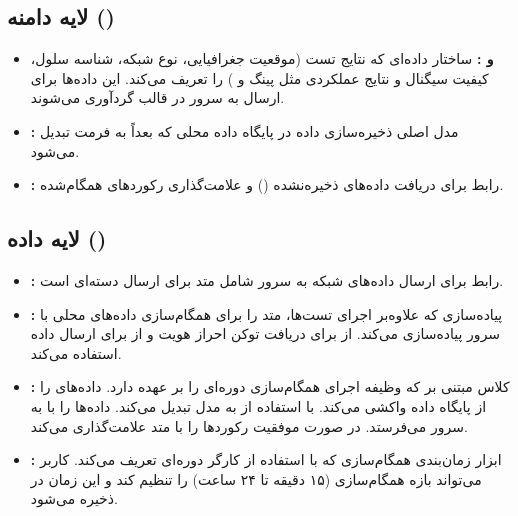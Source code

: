 \subsection{لایه دامنه ()}
\begin{itemize}
    \item \textbf{ و :}  
    ساختار داده‌ای که نتایج تست (موقعیت جغرافیایی، نوع شبکه، شناسه سلول، کیفیت سیگنال و نتایج عملکردی مثل پینگ و ) را تعریف می‌کند. این داده‌ها برای ارسال به سرور در قالب  گردآوری می‌شوند.
    
    \item \textbf{:}  
    مدل اصلی ذخیره‌سازی داده در پایگاه داده محلی که بعداً به فرمت  تبدیل می‌شود.
    
    \item \textbf{:}  
    رابط  برای دریافت داده‌های ذخیره‌نشده () و علامت‌گذاری رکوردهای همگام‌شده.
\end{itemize}

\subsection{لایه داده ()}
\begin{itemize}
    \item \textbf{:}  
    رابط  برای ارسال داده‌های شبکه به سرور شامل متد  برای ارسال دسته‌ای  است.
    
    \item \textbf{:}  
    پیاده‌سازی  که علاوه‌بر اجرای تست‌ها، متد  را برای همگام‌سازی داده‌های محلی با سرور پیاده‌سازی می‌کند. از  برای دریافت توکن احراز هویت و از  برای ارسال داده استفاده می‌کند.
    
    \item \textbf{:}  
    کلاس  مبتنی بر  که وظیفه اجرای همگام‌سازی دوره‌ای را بر عهده دارد.  
    داده‌های  را از پایگاه داده واکشی می‌کند.  
    با استفاده از  به مدل  تبدیل می‌کند.  
    داده‌ها را با  به سرور می‌فرستد.  
    در صورت موفقیت رکوردها را با متد  علامت‌گذاری می‌کند.
    
    \item \textbf{:}  
    ابزار زمان‌بندی همگام‌سازی که با استفاده از  کارگر دوره‌ای تعریف می‌کند. کاربر می‌تواند بازه همگام‌سازی (۱۵ دقیقه تا ۲۴ ساعت) را تنظیم کند و این زمان در  ذخیره می‌شود.
\end{itemize}

